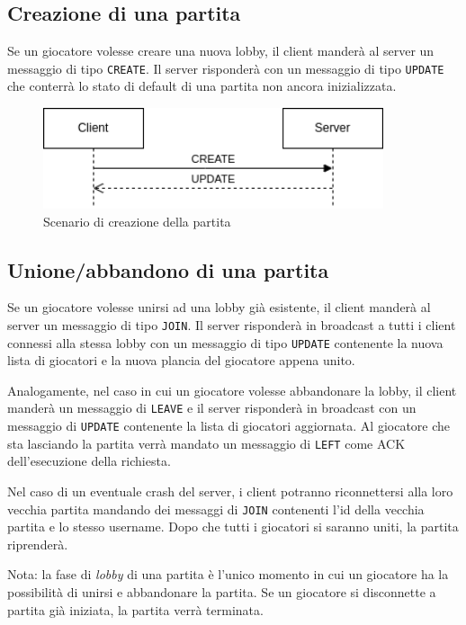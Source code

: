 \documentclass[a4paper,12pt]{article}
\begin{document}
\subsection{Creazione di una partita}

Se un giocatore volesse creare una nuova lobby, il client manderà al server
un messaggio di tipo \texttt{CREATE}. Il server risponderà con un messaggio
di tipo \texttt{UPDATE} che conterrà lo stato di default di una partita non
ancora inizializzata.

\begin{figure}[htb]
  \centering
  \includegraphics[width=10cm]{create.png}
  \caption{Scenario di creazione della partita}%
  \label{fig:create}
\end{figure}

\subsection{Unione/abbandono di una partita}

Se un giocatore volesse unirsi ad una lobby già esistente, il client manderà
al server un messaggio di tipo \texttt{JOIN}. Il server risponderà in
broadcast a tutti i client connessi alla stessa lobby con un messaggio di
tipo \texttt{UPDATE} contenente la nuova lista di giocatori e la nuova
plancia del giocatore appena unito.

Analogamente, nel caso in cui un giocatore volesse abbandonare la lobby, il
client manderà un messaggio di \texttt{LEAVE} e il server risponderà in
broadcast con un messaggio di \texttt{UPDATE} contenente la lista di
giocatori aggiornata. Al giocatore che sta lasciando la partita verrà mandato un
messaggio di \texttt{LEFT} come ACK dell'esecuzione della richiesta.

Nel caso di un eventuale crash del server, i client potranno riconnettersi alla
loro vecchia partita mandando dei messaggi di \texttt{JOIN} contenenti l'id
della vecchia partita e lo stesso username. Dopo che tutti i giocatori si
saranno uniti, la partita riprenderà.

Nota: la fase di \textit{lobby} di una partita è l'unico momento in cui un
giocatore ha la possibilità di unirsi e abbandonare la partita. Se un
giocatore si disconnette a partita già iniziata, la partita verrà terminata.
\end{document}
